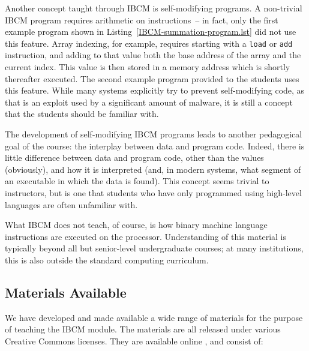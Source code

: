 Another concept taught through IBCM is self-modifying programs.  A
non-trivial IBCM program requires arithmetic on instructions~-- in
fact, only the first example program shown in
Listing~\ref{IBCM-summation-program.lst} did not use this feature.  Array indexing,
for example, requires starting with a {\tt load} or {\tt add}
instruction, and adding to that value both the base address of the
array and the current index.  This value is then stored in a memory
address which is shortly thereafter executed.  The second example
program provided to the students uses this feature.  While many
systems explicitly try to prevent self-modifying code, as that is an
exploit used by a significant amount of malware, it is still a concept
that the students should be familiar with.

The development of self-modifying IBCM programs leads to another
pedagogical goal of the course: the interplay between data and program
code.  Indeed, there is little difference between data and program
code, other than the values (obviously), and how it is interpreted
(and, in modern systems, what segment of an executable in which the
data is found).  This concept seems trivial to instructors, but is one
that students who have only programmed using high-level languages are
often unfamiliar with.

What IBCM does not teach, of course, is how binary machine
language instructions are executed on the processor.  Understanding of
this material is typically beyond all but senior-level undergraduate
courses; at many institutions, this is also outside the
standard computing curriculum.

\subsection{Materials Available}

We have developed and made available a wide range of materials for the
purpose of teaching the IBCM module.  The materials are all released
under various Creative Commons licenses.  They are available online
\cite{ibcm-website}, and consist of:

